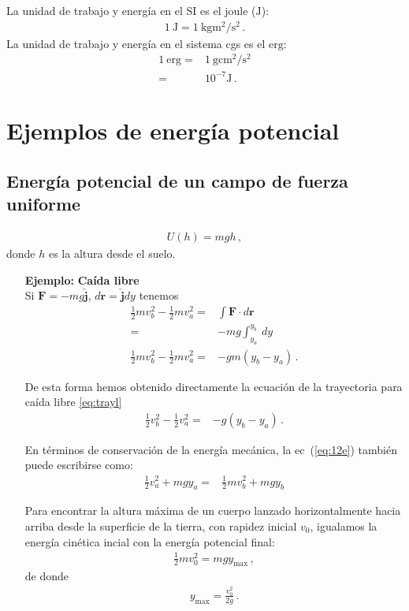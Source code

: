 La unidad de trabajo y energía en el SI es el joule ($\si{\joule}$):
\begin{align}
  \SI{1}{\joule}=\SI{1}{\kilo\gram\metre^2\per\second^2}\,.
\end{align}
La unidad de trabajo y energía en el sistema cgs es el $\text{erg}$:
\begin{align}
  1\ \text{erg}=&\SI{1}{\gram\centi\meter^2\per\second^2}\nonumber\\
=&10^{-7}\si{\joule}\,.
\end{align}

\section{Ejemplos de energía potencial}

\subsection{Energía potencial de un campo de fuerza uniforme}
\begin{align}
  U(h)=mgh\,,
\end{align}
donde $h$ es la altura desde el suelo.

\begin{itemize}
\item[\textbf{Ejemplo:}] \textbf{Caída libre}\\
Si $\mathbf{F}=-mg\hat{\mathbf{j}}$, $d\mathbf{r}=\hat{\mathbf{j}}dy$ tenemos
\begin{align}
\label{eq:12e}
  \tfrac{1}{2}mv_b^2-\tfrac{1}{2}mv_a^2=&\int\mathbf{F}\cdot d\mathbf{r}\nonumber\\
  =&-mg \int_{y_a}^{y_b}\, dy\nonumber\\
  \tfrac{1}{2}mv_b^2-\tfrac{1}{2}mv_a^2=&-gm(y_b-y_a)\,.
\end{align}

De esta forma hemos obtenido directamente la ecuación de la trayectoria para caída libre \eqref{eq:trayl}
\begin{align}
  \tfrac{1}{2}v_b^2-\tfrac{1}{2}v_a^2=&-g(y_b-y_a)\,.
\end{align}

En términos de conservación de la energía mecánica, la ec~(\ref{eq:12e}) también puede escribirse como:
\begin{align}
  \tfrac{1}{2}v_a^2+mgy_a=&\tfrac{1}{2}mv_b^2+mgy_b
\end{align}


Para encontrar la altura máxima de un cuerpo lanzado horizontalmente hacia arriba desde la superficie de la tierra, con rapidez inicial $v_0$, igualamos la energía cinética incial con la energía potencial final:
\begin{align}
  \frac{1}{2}mv_0^2=mgy_{\text{max}}\,,
\end{align}
de donde
\begin{align}
  y_{\text{max}}=\frac{v_0^2}{2g}\,.
\end{align}

\end{itemize}


